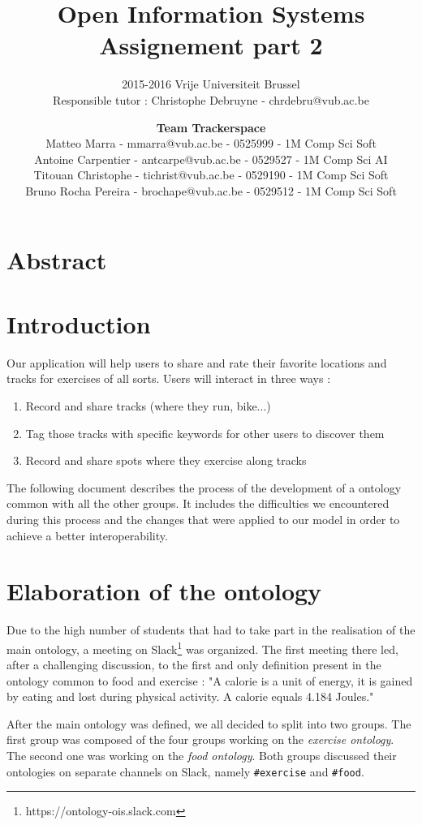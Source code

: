\documentclass[a4paper]{article}
\title{\textbf{Open Information Systems\\Assignement part 2}}
\subtitle{2015-2016 Vrije Universiteit Brussel\\Responsible tutor : Christophe Debruyne - chrdebru@vub.ac.be}
\author{\textbf{Team Trackerspace}\\Matteo Marra - mmarra@vub.ac.be - 0525999 - 1M Comp Sci Soft\\Antoine Carpentier - antcarpe@vub.ac.be - 0529527 - 1M Comp Sci AI\\Titouan Christophe - tichrist@vub.ac.be - 0529190 - 1M Comp Sci Soft\\Bruno Rocha Pereira - brochape@vub.ac.be - 0529512 - 1M Comp Sci Soft}
\begin{document}
\maketitle

\section{Abstract}
\section{Introduction}

Our application will help users to share and rate their favorite locations and tracks for exercises of all sorts. Users will interact in three ways : 

\begin{enumerate}
    \item Record and share tracks (where they run, bike...)
    \item Tag those tracks with specific keywords for other users to discover them
    \item Record and share spots where they exercise along tracks
\end{enumerate}

The following document describes the process of the development of a ontology common with all the other groups. It includes the difficulties we encountered during this process and the changes that were applied to our model in order to achieve a better interoperability.




\section{Elaboration of the ontology}
Due to the high number of students that had to take part in the realisation of the main ontology, a meeting on Slack\footnote{https://ontology-ois.slack.com} was organized. The first meeting there led, after a challenging discussion, to the first and only definition present in the ontology common to food and exercise : "A calorie is a unit of energy, it is gained by eating and lost during physical activity. A calorie equals 4.184 Joules." 

After the main ontology was defined, we all decided to split into two groups. The first group was composed of the four groups working on the \textit{exercise ontology}. The second one was working on the \textit{food ontology}. Both groups discussed their ontologies on separate channels on Slack, namely \texttt{\#exercise} and \texttt{\#food}.
\end{document}
